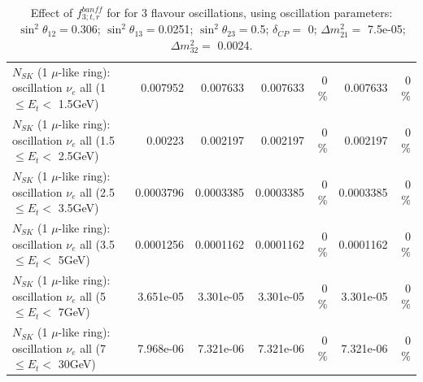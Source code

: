 \begin{table}
\begin{tabular}{| l | r | r | r  r | r  r |}
$N_{SK}$ (1 $\mu$-like ring): oscillation $\nu_{e}$ all (1 $\leq E_{t} <$ 1.5GeV) &        0.007952 &        0.007633 &        0.007633 &        0 \%  &        0.007633 &        0 \%  \\ 
$N_{SK}$ (1 $\mu$-like ring): oscillation $\nu_{e}$ all (1.5 $\leq E_{t} <$ 2.5GeV) &         0.00223 &        0.002197 &        0.002197 &        0 \%  &        0.002197 &        0 \%  \\ 
$N_{SK}$ (1 $\mu$-like ring): oscillation $\nu_{e}$ all (2.5 $\leq E_{t} <$ 3.5GeV) &       0.0003796 &       0.0003385 &       0.0003385 &        0 \%  &       0.0003385 &        0 \%  \\ 
$N_{SK}$ (1 $\mu$-like ring): oscillation $\nu_{e}$ all (3.5 $\leq E_{t} <$ 5GeV) &       0.0001256 &       0.0001162 &       0.0001162 &        0 \%  &       0.0001162 &        0 \%  \\ 
 $N_{SK}$ (1 $\mu$-like ring): oscillation $\nu_{e}$ all (5 $\leq E_{t} <$ 7GeV) &       3.651e-05 &       3.301e-05 &       3.301e-05 &        0 \%  &       3.301e-05 &        0 \%  \\ 
$N_{SK}$ (1 $\mu$-like ring): oscillation $\nu_{e}$ all (7 $\leq E_{t} <$ 30GeV) &       7.968e-06 &       7.321e-06 &       7.321e-06 &        0 \%  &       7.321e-06 &        0 \%  \\ 
\hline
\hline
\end{tabular}
\caption{ Effect of $f_{3; t, r}^{banff}$ for for 3 flavour oscillations, using oscillation parameters:  $\sin^2\theta_{12} = $0.306; $\sin^2\theta_{13} = $0.0251; $\sin^2\theta_{23} = $0.5; $\delta_{CP} = $        0; $\Delta m^2_{21} = $    7.5e-05; $\Delta m^2_{32} = $    0.0024. }
\label{tab:num_banff_03_1RmuT_3f_osc_t13:0.0251}
\end{table}
\clearpage
